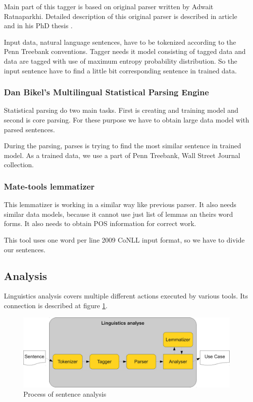 Main part of this tagger is based on original parser written by Adwait Ratnaparkhi. Detailed description of this original parser is described in article \cite{Linguistics-ratnaparkhi96} and in his PhD thesis \cite{Linguistics-ratnaparkhi98}. 

Input data, natural language sentences, have to be tokenized according to the Penn Treebank conventions. Tagger needs it model consisting of tagged data and data are tagged with use of maximum entropy probability distribution. So the input sentence have to find a little bit corresponding sentence in trained data.
  
\subsubsection{Dan Bikel's Multilingual Statistical Parsing Engine}   

Statistical parsing do two main tasks. First is creating and training model and second is core parsing. For these purpose we have to obtain large data model with parsed sentences. 

During the parsing, parses is trying to find the most similar sentence in trained model. As a trained data, we use a part of Penn Treebank, Wall Street Journal collection.

\subsubsection{Mate-tools lemmatizer}          
          
This lemmatizer is working in a similar way like previous parser. It also needs similar data models, because it cannot use just list of lemmas an theirs word forms. It also needs to obtain POS information for correct work.

This tool uses one word per line 2009 CoNLL  input format, so we have to divide our sentences.

\subsection{Analysis}
\label{sec:analysis}
Linguistics analysis covers multiple different actions executed by various tools. Its connection is described at figure \ref{fig:LinguisticsAnalyse}. 

\begin{figure}[ht]
  \centering
  \includegraphics[width=400pt]{images/LinguisticsAnalyse}
  \caption{Process of sentence analysis}
  \label{fig:LinguisticsAnalyse}
\end{figure}

